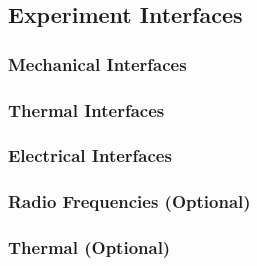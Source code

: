 \subsection{Experiment Interfaces}

\subsubsection{Mechanical Interfaces}
\label{sec:4.2.1}

\bigskip
%


\subsubsection{Thermal Interfaces}
\label{sec:4.2.2}


\subsubsection{Electrical Interfaces}
\label{sec:4.2.3}



\subsubsection{Radio Frequencies (Optional)}


\subsubsection{Thermal (Optional)}



\raggedbottom
